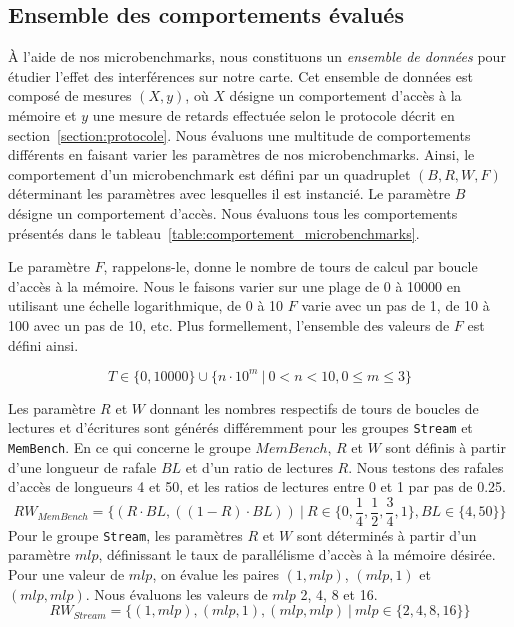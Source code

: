 \subsection{\label{section:microbench_dataset}Ensemble des comportements évalués}

À l'aide de nos microbenchmarks, nous constituons un \emph{ensemble de données} pour étudier l'effet des interférences sur notre carte.
Cet ensemble de données est composé de mesures $(X,y)$, où $X$ désigne un comportement d'accès à la mémoire et $y$ une mesure de retards effectuée selon le protocole décrit en section~\ref{section:protocole}.
Nous évaluons une multitude de comportements différents en faisant varier les paramètres de nos microbenchmarks.
Ainsi, le comportement d'un microbenchmark est défini par un quadruplet $(B, R, W, F)$ déterminant les paramètres avec lesquelles il est instancié.
Le paramètre $B$ désigne un comportement d'accès.
Nous évaluons tous les comportements présentés dans le tableau~\ref{table:comportement_microbenchmarks}.

Le paramètre $F$, rappelons-le, donne le nombre de tours de calcul par boucle d'accès à la mémoire.
Nous le faisons varier sur une plage de 0 à 10000 en utilisant une échelle logarithmique, de 0 à 10 $F$ varie avec un pas de 1, de 10 à 100 avec un pas de 10, etc.
Plus formellement, l'ensemble des valeurs de $F$ est défini ainsi.

\begin{equation}
	T \in \{0, 10000\} \cup \{n \cdot 10^m\ |\ 0 < n < 10, 0 \le m \le 3\}
\end{equation}

Les paramètre $R$ et $W$ donnant les nombres respectifs de tours de boucles de lectures et d'écritures sont générés différemment pour les groupes \texttt{Stream} et \texttt{MemBench}.
En ce qui concerne le groupe $MemBench$, $R$ et $W$ sont définis à partir d'une longueur de rafale $BL$ et d'un ratio de lectures $R$.
Nous testons des rafales d'accès de longueurs 4 et 50, et les ratios de lectures entre 0 et 1 par pas de 0.25.
\begin{equation}
	RW_{MemBench} = \{(R \cdot BL, ((1-R) \cdot BL))\ |\ R \in \{0, \frac{1}{4}, \frac{1}{2}, \frac{3}{4}, 1\}, BL \in \{4, 50\}\}
\end{equation}
Pour le groupe \texttt{Stream}, les paramètres $R$ et $W$ sont déterminés à partir d'un paramètre $mlp$, définissant le taux de parallélisme d'accès à la mémoire désirée.
Pour une valeur de $mlp$, on évalue les paires $(1, mlp)$, $(mlp, 1)$ et $(mlp, mlp)$.
Nous évaluons les valeurs de $mlp$ 2, 4, 8 et 16.
\begin{equation}
	RW_{Stream} = \{(1, mlp),(mlp,1), (mlp, mlp)\ |\ mlp \in \{2, 4, 8, 16\}\}
\end{equation}

